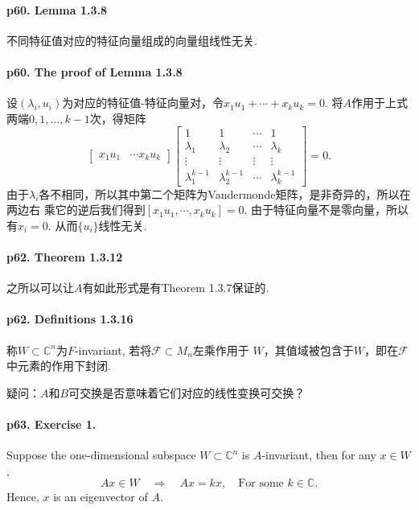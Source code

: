   \paragraph{p60. Lemma 1.3.8} 
    不同特征值对应的特征向量组成的向量组线性无关. 
  \paragraph{p60. The proof of Lemma 1.3.8}
    设$(\lambda_i, u_i)$为对应的特征值-特征向量对，令$x_1u_1+\cdots+x_ku_k=0$.
    将$A$作用于上式两端$0,1,\dots,k-1$次，得矩阵
    \[
      \begin{bmatrix}
        x_1u_1 & \cdots x_ku_k
      \end{bmatrix}
      \begin{bmatrix}
        1          & 1 & \cdots & 1 \\
        \lambda_1  & \lambda_2 & \cdots & \lambda_k \\
        \vdots & \vdots & \vdots & \vdots \\
        \lambda_1^{k-1} & \lambda_2^{k-1} & \cdots & \lambda_k^{k-1}
      \end{bmatrix}
      =0.
    \]
    由于$\lambda_i$各不相同，所以其中第二个矩阵为Vandermonde矩阵，是非奇异的，所以在两边右
    乘它的逆后我们得到$[x_1u_1, \cdots, x_ku_k] = 0$. 由于特征向量不是零向量，所以有$x_i
    =0$. 从而$\{u_i\}$线性无关. 

  \paragraph{p62. Theorem 1.3.12}
    之所以可以让$A$有如此形式是有Theorem 1.3.7保证的. 

  \paragraph{p62. Definitions 1.3.16}
    称$W\subset\mathbb{C}^n$为$F$-invariant, 若将$\mathcal{F}\subset M_n$左乘作用于
    $W$，其值域被包含于$W$，即在$\mathcal{F}$中元素的作用下封闭. \par
    疑问：$A$和$B$可交换是否意味着它们对应的线性变换可交换？

  \paragraph{p63. Exercise 1.}
    Suppose the one-dimensional subspace $W \subset \mathbb{C}^n$ is 
    $A$-invariant, then for any $x\in W$, 
    \[
      Ax\in W \quad\Rightarrow\quad Ax=kx,\quad\text{For some $k\in\mathbb{C}$.}
    \]
    Hence, $x$ is an eigenvector of $A$.

